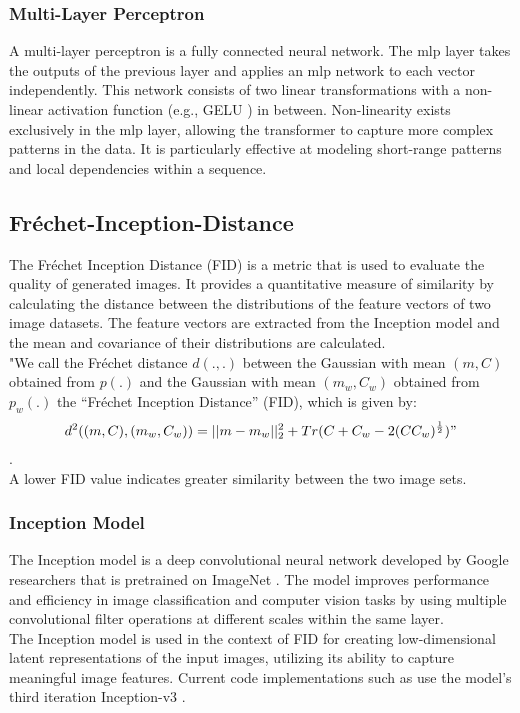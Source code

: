 \subsubsection*{Multi-Layer Perceptron}
A multi-layer perceptron is a fully connected neural network. The mlp layer takes the outputs of the previous layer and applies an mlp network to each vector independently. This network consists of two linear transformations with a non-linear activation function (e.g., GELU \cite{hendrycks2016gaussian}) in between. Non-linearity exists exclusively in the mlp layer, allowing the transformer to capture more complex patterns in the data. It is particularly effective at modeling short-range patterns and local dependencies within a sequence.



\subsection{Fréchet-Inception-Distance}
The Fréchet Inception Distance (FID) is a metric that is used to evaluate the quality of generated images. It provides a quantitative measure of similarity by calculating the distance between the distributions of the feature vectors of two image datasets. The feature vectors are extracted from the Inception model and the mean and covariance of their distributions are calculated.\\
"We call the Fréchet distance \(d(., .)\)
between the Gaussian with mean \((m, C)\) obtained from \(p(.)\) and the Gaussian with mean \((m_w, C_w)\)
obtained from \(p_w(.)\) the “Fréchet Inception Distance” (FID), which is given by:
\begin{align*}
    d^2((m,C),(m_w,C_w)) = || m - m_w ||_2^2 + Tr(C+C_w-2(CC_w)^\frac{1}{2})" 
\end{align*}
\cite{heusel2017gans}.\\
A lower FID value indicates greater similarity between the two image sets.



\subsubsection{Inception Model}
The Inception model \cite{Szegedy_2015_CVPR} is a deep convolutional neural network developed by Google researchers that is pretrained on ImageNet \cite{deng2009imagenet}. The model improves performance and efficiency in image classification and computer vision tasks by using multiple convolutional filter operations at different scales within the same layer.\\
The Inception model is used in the context of FID for creating low-dimensional latent representations of the input images, utilizing its ability to capture meaningful image features.
Current code implementations such as \cite{Seitzer2020FID} use the model's third iteration Inception-v3 \cite{szegedy2016rethinking}.



